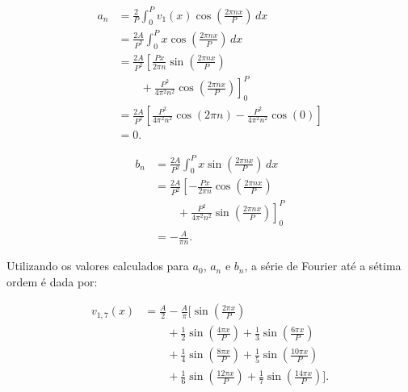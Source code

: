 \begin{equation}
    \begin{aligned}
        a_n &= \frac{2}{P} \int_{0}^{P} v_1(x)
            \cos\left(\frac{2\pi nx}{P}\right)\,dx \\
            &= \frac{2A}{P^2} \int_{0}^{P} x
            \cos\left(\frac{2\pi nx}{P}\right)\,dx \\
            &= \frac{2A}{P^2} \left[
            \frac{Px}{2\pi n}\sin\left(\frac{2\pi nx}{P}\right)\right. \\
            &\qquad \left.{}+ \frac{P^2}{4\pi^2 n^2}
            \cos\left(\frac{2\pi nx}{P}\right)\right]_{0}^{P} \\
            &= \frac{2A}{P^2} \left[
            \frac{P^2}{4\pi^2 n^2}\cos(2\pi n)
            - \frac{P^2}{4\pi^2 n^2}\cos(0)\right] \\
            &= 0.
    \end{aligned}
\end{equation}

\begin{equation}
    \begin{aligned}
        b_n &= \frac{2A}{P^2} \int_{0}^{P} x
            \sin\left(\frac{2\pi nx}{P}\right)\,dx \\
            &= \frac{2A}{P^2} \left[
            -\frac{Px}{2\pi n}\cos\left(\frac{2\pi nx}{P}\right)\right. \\
            &\qquad \left.{}+ \frac{P^2}{4\pi^2 n^2}
            \sin\left(\frac{2\pi nx}{P}\right)\right]_{0}^{P} \\
            &= -\frac{A}{\pi n}.
    \end{aligned}
\end{equation}

Utilizando os valores calculados para $a_0$, $a_n$ e $b_n$, a série de Fourier
até a sétima ordem é dada por:

\begin{equation}
    \begin{aligned}
        v_{1,7}(x) &= \frac{A}{2} - \frac{A}{\pi}\biggl[
            \sin\left(\frac{2\pi x}{P}\right) \\
            &\qquad {}+ \frac{1}{2}\sin\left(\frac{4\pi x}{P}\right)
             + \frac{1}{3}\sin\left(\frac{6\pi x}{P}\right) \\
            &\qquad {}+ \frac{1}{4}\sin\left(\frac{8\pi x}{P}\right)
             + \frac{1}{5}\sin\left(\frac{10\pi x}{P}\right) \\
            &\qquad {}+ \frac{1}{6}\sin\left(\frac{12\pi x}{P}\right)
             + \frac{1}{7}\sin\left(\frac{14\pi x}{P}\right)\biggr].
    \end{aligned}
\end{equation}


